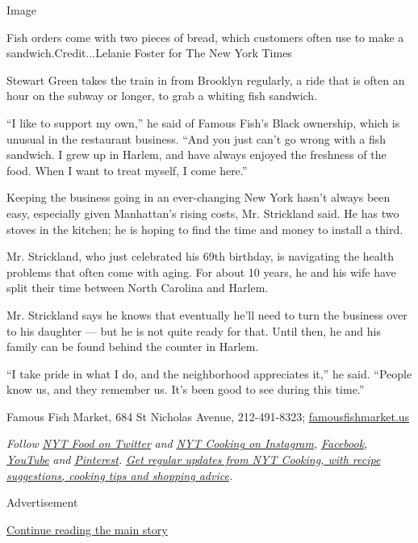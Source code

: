 Image

Fish orders come with two pieces of bread, which customers often use to
make a sandwich.Credit...Lelanie Foster for The New York Times

Stewart Green takes the train in from Brooklyn regularly, a ride that is
often an hour on the subway or longer, to grab a whiting fish sandwich.

``I like to support my own,'' he said of Famous Fish's Black ownership,
which is unusual in the restaurant business. ``And you just can't go
wrong with a fish sandwich. I grew up in Harlem, and have always enjoyed
the freshness of the food. When I want to treat myself, I come here.''

Keeping the business going in an ever-changing New York hasn't always
been easy, especially given Manhattan's rising costs, Mr. Strickland
said. He has two stoves in the kitchen; he is hoping to find the time
and money to install a third.

Mr. Strickland, who just celebrated his 69th birthday, is navigating the
health problems that often come with aging. For about 10 years, he and
his wife have split their time between North Carolina and Harlem.

Mr. Strickland says he knows that eventually he'll need to turn the
business over to his daughter --- but he is not quite ready for that.
Until then, he and his family can be found behind the counter in Harlem.

``I take pride in what I do, and the neighborhood appreciates it,'' he
said. ``People know us, and they remember us. It's been good to see
during this time.''

Famous Fish Market, 684 St Nicholas Avenue, 212-491-8323;
\href{http://www.famousfishmarket.us/}{famousfishmarket.us}

\emph{Follow} \href{https://twitter.com/nytfood}{\emph{NYT Food on
Twitter}} \emph{and}
\href{https://www.instagram.com/nytcooking/}{\emph{NYT Cooking on
Instagram}}\emph{,}
\href{https://www.facebookcorewwwi.onion/nytcooking/}{\emph{Facebook}}\emph{,}
\href{https://www.youtube.com/nytcooking}{\emph{YouTube}} \emph{and}
\href{https://www.pinterest.com/nytcooking/}{\emph{Pinterest}}\emph{.}
\href{https://www.nytimes3xbfgragh.onion/newsletters/cooking}{\emph{Get
regular updates from NYT Cooking, with recipe suggestions, cooking tips
and shopping advice}}\emph{.}

Advertisement

\protect\hyperlink{after-bottom}{Continue reading the main story}

